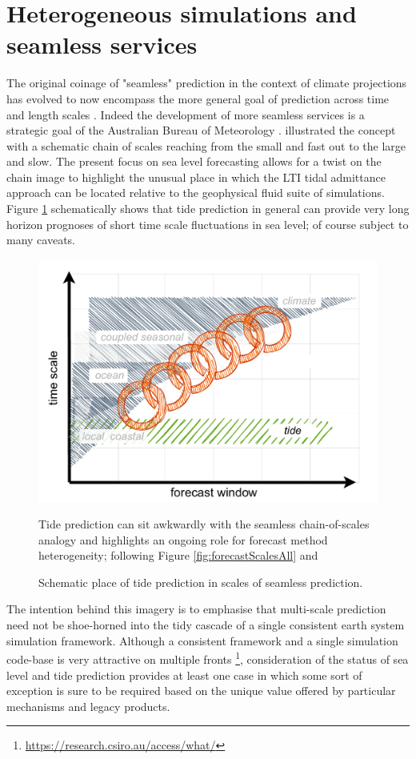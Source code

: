 \section{Heterogeneous simulations and seamless services}
The original coinage of "seamless" prediction in the context of climate projections has evolved to now encompass the more general goal of prediction across time and length scales \citep{10.1127/metz/2020/1048}.
Indeed the development of more seamless services is a strategic goal of the Australian Bureau of Meteorology \citep{BOM2020}.
\citep{10.1175/bams-89-4-459} illustrated the concept with a schematic chain of scales reaching from the small and fast out to the large and slow.
The present focus on sea level forecasting allows for a twist on the chain image to highlight the unusual place in which the LTI tidal admittance approach can be located relative to the geophysical fluid suite of simulations.
Figure \ref{fig:forecastScalesChain} schematically shows that tide prediction in general can provide very long horizon prognoses of short time scale fluctuations in sea level; of course subject to many caveats.
\begin{figure}[!hbt] \centering
        \includegraphics[width=\figwidthFull]{figures/diagrams/scales_with_chain_labelled.pdf} 
        \caption{Schematic place of tide prediction in scales of seamless prediction.}
        {Tide prediction can sit awkwardly with the seamless chain-of-scales analogy and highlights an ongoing role for forecast method heterogeneity; following Figure \ref{fig:forecastScalesAll} and \citep{10.1175/bams-89-4-459}}
        \label{fig:forecastScalesChain}
\end{figure}
The intention behind this imagery is to emphasise that multi-scale prediction need not be shoe-horned into the tidy cascade of a single consistent earth system simulation framework.
Although a consistent framework and a single simulation code-base is very attractive on multiple fronts  \footnote{\url{https://research.csiro.au/access/what/}}, consideration of the status of sea level and tide prediction provides at least one case in which some sort of exception is sure to be required based on the unique value offered by particular mechanisms and legacy products.  

